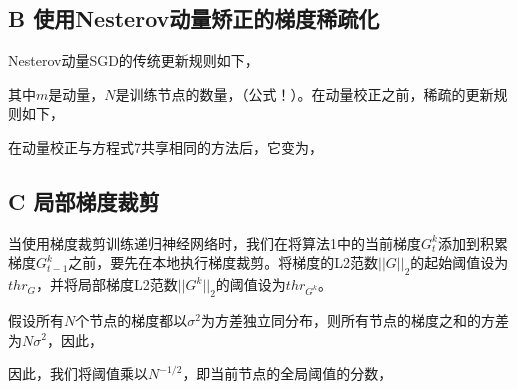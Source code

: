 \subsection{B 使用Nesterov动量矫正的梯度稀疏化}
Nesterov动量SGD的传统更新规则如下，

其中$m$是动量，$N$是训练节点的数量，（公式！）。在动量校正之前，稀疏的更新规则如下，

在动量校正与方程式7共享相同的方法后，它变为，

\subsection{C 局部梯度裁剪}
当使用梯度裁剪训练递归神经网络时，我们在将算法1中的当前梯度$G^k_t$添加到积累梯度$G^k_{t-1}$之前，要先在本地执行梯度裁剪。将梯度的L2范数$||G||_2$的起始阈值设为$thr_G$，并将局部梯度L2范数$||G^k||_2$的阈值设为$thr_{G^k}$。

假设所有$N$个节点的梯度都以$\sigma^2$为方差独立同分布，则所有节点的梯度之和的方差为$N\sigma^2$，因此，

因此，我们将阈值乘以$N^{-1/2}$，即当前节点的全局阈值的分数，

